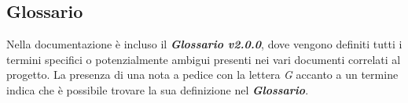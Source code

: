 \subsection{Glossario}
Nella documentazione è incluso il \textbf{\textit{Glossario v2.0.0}}, dove vengono definiti tutti i termini specifici o potenzialmente ambigui presenti nei vari documenti correlati al progetto. La presenza di una nota a pedice con la lettera \textit{G} accanto a un termine indica che è possibile trovare la sua definizione nel \textbf{\textit{Glossario}}.  

